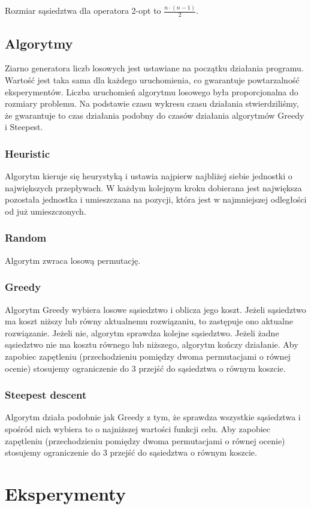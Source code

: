 \documentclass[a4paper,10pt]{article}
\begin{document}
Rozmiar sąsiedztwa dla operatora 2-opt to $\frac{n \cdot (n-1)}{2}$. 

\subsection{Algorytmy}
Ziarno generatora liczb losowych jest ustawiane na początku działania programu.
Wartość jest taka sama dla każdego uruchomienia, co gwarantuje powtarzalność eksperymentów.
Liczba uruchomień algorytmu losowego była proporcjonalna do rozmiary problemu.
Na podstawie czasu wykresu czasu działania stwierdziliśmy, że gwarantuje to czas działania podobny do czasów działania algorytmów Greedy i Steepest.
\subsubsection{Heuristic}
Algorytm kieruje się heurystyką i ustawia najpierw najbliżej siebie jednostki o największych przepływach.
W każdym kolejnym kroku dobierana jest największa pozostała jednostka i umieszczana na pozycji, która jest w najmniejszej odległości od już umieszczonych.
\subsubsection{Random}
Algorytm zwraca losową permutację.
\subsubsection{Greedy}
Algorytm Greedy wybiera losowe sąsiedztwo i oblicza jego koszt.
Jeżeli sąsiedztwo ma koszt niższy lub równy aktualnemu rozwiązaniu, to zastępuje ono aktualne rozwiązanie.
Jeżeli nie, algorytm sprawdza kolejne sąsiedztwo.
Jeżeli żadne sąsiedztwo nie ma kosztu równego lub niższego, algorytm kończy działanie.
Aby zapobiec zapętleniu (przechodzieniu pomiędzy dwoma permutacjami o równej ocenie) stosujemy ograniczenie do 3 przejść do sąsiedztwa o równym koszcie.
\subsubsection{Steepest descent}
Algorytm działa podobnie jak Greedy z tym, że sprawdza wszystkie sąsiedztwa i spośród nich wybiera to o najniższej wartości funkcji celu.
Aby zapobiec zapętleniu (przechodzieniu pomiędzy dwoma permutacjami o równej ocenie) stosujemy ograniczenie do 3 przejść do sąsiedztwa o równym koszcie.

\section{Eksperymenty}
\end{document}

